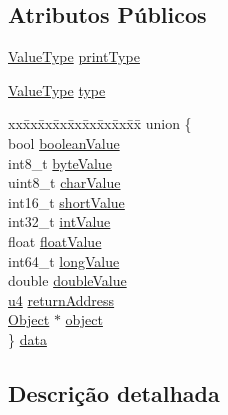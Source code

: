 \subsection*{Atributos Públicos}
\begin{DoxyCompactItemize}
\item 
\hyperlink{BasicTypes_8h_ad9971b6ef33e02ba2c75d19c1d2518a1}{Value\+Type} \hyperlink{structValue_aa4139e3895034b3b47155a5862ea2010}{print\+Type}
\item 
\hyperlink{BasicTypes_8h_ad9971b6ef33e02ba2c75d19c1d2518a1}{Value\+Type} \hyperlink{structValue_ab45dfd167290d4324ba4832abcc4064d}{type}
\item 
\begin{tabbing}
xx\=xx\=xx\=xx\=xx\=xx\=xx\=xx\=xx\=\kill
union \{\\
\>bool \hyperlink{structValue_a30e34bb4435bed7be1c5287e8f4c4838}{booleanValue}\\
\>int8\_t \hyperlink{structValue_a5fe45e55ee027508eaa68b9133776591}{byteValue}\\
\>uint8\_t \hyperlink{structValue_a100a56df80b9c3f796f053b9eef2b69a}{charValue}\\
\>int16\_t \hyperlink{structValue_a9055b0f42ce03a06758b262c3bb32358}{shortValue}\\
\>int32\_t \hyperlink{structValue_a0a2a9c06ef5a473232b4349395fd68dd}{intValue}\\
\>float \hyperlink{structValue_a45b6c1f608872f5420b3da208a7c1ef0}{floatValue}\\
\>int64\_t \hyperlink{structValue_a91024026ad1f8f7221fa84f5a44a3d6c}{longValue}\\
\>double \hyperlink{structValue_a645fe257d42cf5076170f86f9f1ab65c}{doubleValue}\\
\>\hyperlink{BasicTypes_8h_ae5be1f726785414dd1b77d60df074c9d}{u4} \hyperlink{structValue_a0ff202a46baf275595d520cf800f596e}{returnAddress}\\
\>\hyperlink{classObject}{Object} $\ast$ \hyperlink{structValue_a39c8a4a3203f603f82f1c80561bc735b}{object}\\
\} \hyperlink{structValue_a2835134be157447a3ceda1a1e839ba9e}{data}\\

\end{tabbing}\end{DoxyCompactItemize}


\subsection{Descrição detalhada}


